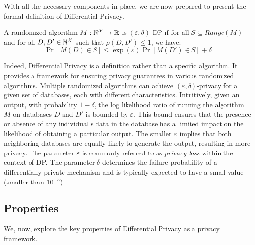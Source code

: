 With all the necessary components in place, we are now prepared to present the formal definition of Differential Privacy.
\begin{definition}
  \label{def:dp}
  A randomized algorithm $M: \mathbb{N}^\mathcal{X} \rightarrow \mathbb{R}$ is $(\varepsilon, \delta)$-DP if for all ${S} \subseteq Range(M)$ and for  all $D, D' \in \mathbb{N}^\mathcal{X}$ such that $\rho(D, D') \leq 1$, we have:
  \begin{equation*}
    \Pr[M(D) \in S] \leq \exp(\varepsilon)\Pr[M(D') \in S] + \delta
  \end{equation*}
\end{definition}
\noindent
Indeed, Differential Privacy is a definition rather than a specific algorithm.
It provides a framework for ensuring privacy guarantees in various randomized algorithms. Multiple randomized algorithms can achieve $(\varepsilon, \delta)$-privacy for a given set of databases, each with different characteristics. 
Intuitively, given an output, with probability $1-\delta$, the log likelihood ratio of running the algorithm $M$ on databases $D$ and $D'$ is bounded by $\varepsilon$.
This bound ensures that the presence or absence of any individual's data in the database has a limited impact on the likelihood of obtaining a particular output.
The smaller $\varepsilon$ implies that both neighboring databases are equally likely to generate the output, resulting in more privacy.
The parameter $\varepsilon$ is commonly referred to as \textit{privacy loss} within the context of DP.
The parameter $\delta$ determines the failure probability of a differentially private mechanism and is typically expected to have a small value (\ie smaller than $10^{-5}$).


%
%

\subsection{Properties}\label{subsec:background-dp-properties}
We, now, explore the key properties of Differential Privacy as a privacy framework.


